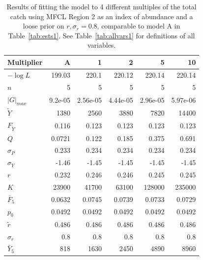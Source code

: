 \documentclass[12pt,letterpaper]{article}
\newcommand\MSY{\widetilde{Y}}
\newcommand\Fmsy{F_{\MSY}}
\begin{document}
\begin{table}
{\small
\caption{Results of fitting the model to 4 different multiples of the
total catch using MFCL Region 2 as an index of abundance and a loose
prior on $r, \sigma_r = 0.8$, comparable to model A in
Table~\ref{tab:ests1}. 
See Table~\ref{tab:allvars1} for definitions of all variables.
\label{tab:k2}}
\begin{center}
\begin{tabular}{|l|r|rrrr|}
\hline
Multiplier & A & 1 & 2 & 5 & 10\\
\hline
\hline
$-\log L$ & 199.03 & 220.1 & 220.12 & 220.14 & 220.14\\
$n$ & 5 & 5 & 5 & 5 & 5\\
$|G|_{max}$ & 9.2e-05 & 2.56e-05 & 4.44e-05 & 2.96e-05 & 5.97e-06\\
\hline
$\MSY$ & 1380 & 2560 & 3880 & 7820 & 14400\\
$\Fmsy$ & 0.116 & 0.123 & 0.123 & 0.123 & 0.123\\
$Q$ & 0.0721 & 0.122 & 0.185 & 0.375 & 0.691\\
$\sigma_P$ & 0.233 & 0.234 & 0.234 & 0.234 & 0.234\\
$\sigma_Y$ & -1.46 & -1.45 & -1.45 & -1.45 & -1.45\\
\hline
$r$ & 0.232 & 0.246 & 0.246 & 0.245 & 0.245\\
$K$ & 23900 & 41700 & 63100 & 128000 & 235000\\
$\bar{F}_5$ & 0.0632 & 0.0745 & 0.0739 & 0.0733 & 0.0729\\
\hline
$p_0$ & 0.0492 & 0.0492 & 0.0492 & 0.0492 & 0.0492\\
$\tilde{r}$ & 0.486 & 0.486 & 0.486 & 0.486 & 0.486\\
$\sigma_r$ & 0.8 & 0.8 & 0.8 & 0.8 & 0.8\\
$\bar{Y}_5$ & 818 & 1630 & 2450 & 4890 & 8960\\
\hline
\end{tabular}
\end{center}
}
\end{table}
\end{document}
